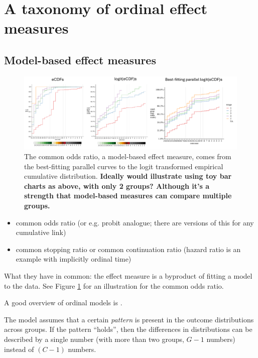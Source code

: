 \documentclass[
  11pt,
  fleqn
]{article}
\begin{document}
\section{A taxonomy of ordinal effect measures}

\subsection{Model-based effect measures}

\begin{figure}
  \includegraphics[width=7in]{illustrating_common_or.pdf}
  \caption{The common odds ratio, a model-based effect measure, comes
    from the best-fitting parallel curves to the logit transformed
    empirical cumulative distribution. \textbf{Ideally would illustrate
      using toy bar charts as above, with only 2 groups? Although it's a
  strength that model-based measures can compare multiple groups.}}
  \label{fig:illustrating_or}
\end{figure}

\begin{itemize}
  \item
    common odds ratio (or e.g. probit analogue; there are versions of
    this for any cumulative link)
  \item common stopping ratio or common continuation
    ratio (hazard ratio is an example with implicitly ordinal time)
\end{itemize}

What they have in common: the effect measure is a byproduct of fitting a model
to the data. See Figure \ref{fig:illustrating_or} for an illustration
for the common odds ratio.

A good overview of ordinal models is \citet{burknerOrdinalRegressionModels2019}.

The model assumes that a certain \emph{pattern} is present in the outcome
distributions across groups. If the pattern ``holds'', then the differences in
distributions can be described by a single number (with more than two groups,
$G-1$ numbers) instead of $(C-1)$ numbers.
\end{document}
